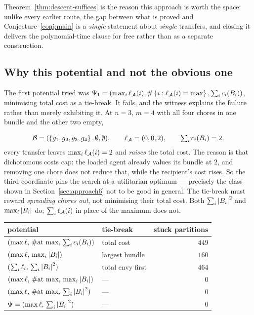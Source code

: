 Theorem~\ref{thm:descent-suffices} is the reason this approach is worth the
space: unlike every earlier route, the gap between what is proved and
Conjecture~\ref{conj:main} is a \emph{single} statement about \emph{single}
transfers, and closing it delivers the polynomial-time clause for free rather
than as a separate construction.

\subsection{Why this potential and not the obvious one}

The first potential tried was
$\Psi_1 = (\max_i \ell_{\mathcal{A}}(i), \#\left\{i : \ell_{\mathcal{A}}(i) = \max\right\},
\sum_i c_i(B_i))$, minimising total cost as a tie-break. It fails, and the
witness explains the failure rather than merely exhibiting it. At $n = 3$,
$m = 4$ with all four chores in one bundle and the other two empty,

\[
  \mathcal B = (\left\{g_1,g_2,g_3,g_4\right\}, \emptyset, \emptyset),
  \qquad \ell_{\mathcal{A}} = (0,0,2),
  \qquad \textstyle\sum_i c_i(B_i) = 2 ,
\]
every transfer leaves $\max_i \ell_{\mathcal{A}}(i) = 2$ and \emph{raises} the total
cost. The reason is that dichotomous costs cap: the loaded agent already values
its bundle at $2$, and removing one chore does not reduce that, while the
recipient's cost rises. So the third coordinate pins the search at a utilitarian
optimum --- precisely the class shown in Section~\ref{sec:approach6} not to be
good in general. The tie-break must reward \emph{spreading chores out}, not
minimising their total cost. Both $\sum_i \left\lvert B_i\right\rvert^2$ and $\max_i \left\lvert B_i\right\rvert$ do;
$\sum_i \ell_{\mathcal{A}}(i)$ in place of the maximum does not.

\begin{center}
\begin{tabular}{llr}
\toprule
potential & tie-break & stuck partitions \\
\midrule
$(\max \ell,\, \#\text{at max},\, \sum_i c_i(B_i))$ & total cost   & $449$ \\
$(\max \ell,\, \max_i \left\lvert B_i\right\rvert)$                       & largest bundle & $160$ \\
$(\sum_i \ell_i,\, \sum_i \left\lvert B_i\right\rvert^2)$                 & total envy first & $464$ \\
\midrule
$(\max \ell,\, \#\text{at max},\, \max_i \left\lvert B_i\right\rvert)$    & ---          & $0$ \\
$(\max \ell,\, \#\text{at max},\, \sum_i \left\lvert B_i\right\rvert^2)$  & ---          & $0$ \\
$\Psi = (\max \ell,\, \sum_i \left\lvert B_i\right\rvert^2)$              & ---          & $0$ \\
\bottomrule
\end{tabular}
\end{center}


